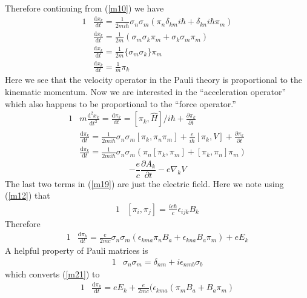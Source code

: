 \documentclass[]{article}
\numberwithin{equation}{subsection}
\begin{document}
Therefore continuing from (\ref{m10}) we have
\begin{alignat}{1}
  \label{m13}		&\frac{\mathrm{d}x_{k}}{\mathrm{d}t}=\frac{1}{2mi\hbar}\sigma_{n}\sigma_{m}(\pi_{n}\delta_{km}i\hbar+\delta_{kn}i\hbar\pi_{m})\\
  \label{m14}		&\frac{\mathrm{d}x_{k}}{\mathrm{d}t}=\frac{1}{2m}(\sigma_{m}\sigma_{k}\pi_{m}+\sigma_{k}\sigma_{m}\pi_{m})\\
  \label{m15}		&\frac{\mathrm{d}x_{k}}{\mathrm{d}t}=\frac{1}{2m}\{\sigma_{m}\sigma_{k}\}\pi_{m}\\
  \label{m16}		&\frac{\mathrm{d}x_{k}}{\mathrm{d}t}=\frac{1}{m}\pi_{k}
\end{alignat}
Here we see that the velocity operator in the Pauli theory is proportional to the kinematic momentum. Now we are interested in the ``acceleration operator'' which also happens to be proportional to the ``force operator.''
\begin{alignat}{1}
  \label{m17}		&m\frac{\mathrm{d}^{2}x_{k}}{\mathrm{d}t^{2}}=\frac{\mathrm{d}\pi_{k}}{\mathrm{d}t}=[\pi_{k},\hat{H}]/i\hbar+\frac{\partial\pi_{k}}{\partial t}\\
  \label{m18}		&\frac{\mathrm{d}\pi_{k}}{\mathrm{d}t}=\frac{1}{2mi\hbar}\sigma_{n}\sigma_{m}[\pi_{k},\pi_{n}\pi_{m}]+\frac{e}{i\hbar}[\pi_{k},V]+\frac{\partial\pi_{k}}{\partial t}\\
  \label{m19}		&\frac{\mathrm{d}\pi_{k}}{\mathrm{d}t}=\frac{1}{2mi\hbar}\sigma_{n}\sigma_{m}(\pi_{n}[\pi_{k},\pi_{m}]+[\pi_{k},\pi_{n}]\pi_{m})
\end{alignat}
$$
-\frac{e}{c}\frac{\partial A_{k}}{\partial t}-e\nabla_{k}V
$$
The last two terms in (\ref{m19}) are just the electric field. Here we note using (\ref{m12}) that
\begin{alignat}{1}
  \label{m20}		&[\pi_{i},\pi_{j}]=\frac{ie\hbar}{c}\epsilon_{ijk}B_{k}
\end{alignat}
Therefore
\begin{alignat}{1}
  \label{m21}		&\frac{\mathrm{d}\pi_{k}}{\mathrm{d}t}=\frac{e}{2mc}\sigma_{n}\sigma_{m}(\epsilon_{kma}\pi_{n}B_{a}+\epsilon_{kna}B_{a}\pi_{m})+eE_{k}
\end{alignat}
A helpful property of Pauli matrices is
\begin{alignat}{1}
  \label{m22}		&\sigma_{n}\sigma_{m}=\delta_{nm}+i\epsilon_{nmb}\sigma_{b}
\end{alignat}
which converts (\ref{m21}) to
\begin{alignat}{1}
  \label{m23}		&\frac{\mathrm{d}\pi_{k}}{\mathrm{d}t}=eE_{k}+\frac{e}{2mc}\Big(\epsilon_{kma}(\pi_{m}B_{a}+B_{a}\pi_{m})
\end{alignat}
\end{document}
